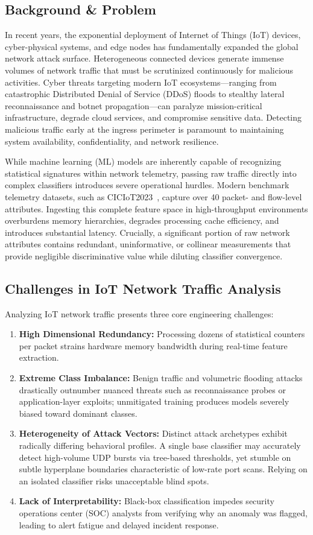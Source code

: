 \documentclass[conference]{IEEEtran}
\begin{document}
\subsection{Background \& Problem}
In recent years, the exponential deployment of Internet of Things (IoT) devices, cyber-physical systems, and edge nodes has fundamentally expanded the global network attack surface. Heterogeneous connected devices generate immense volumes of network traffic that must be scrutinized continuously for malicious activities. Cyber threats targeting modern IoT ecosystems---ranging from catastrophic Distributed Denial of Service (DDoS) floods to stealthy lateral reconnaissance and botnet propagation---can paralyze mission-critical infrastructure, degrade cloud services, and compromise sensitive data. Detecting malicious traffic early at the ingress perimeter is paramount to maintaining system availability, confidentiality, and network resilience.

While machine learning (ML) models are inherently capable of recognizing statistical signatures within network telemetry, passing raw traffic directly into complex classifiers introduces severe operational hurdles. Modern benchmark telemetry datasets, such as CICIoT2023~\cite{ciciot}, capture over 40 packet- and flow-level attributes. Ingesting this complete feature space in high-throughput environments overburdens memory hierarchies, degrades processing cache efficiency, and introduces substantial latency. Crucially, a significant portion of raw network attributes contains redundant, uninformative, or collinear measurements that provide negligible discriminative value while diluting classifier convergence.

\subsection{Challenges in IoT Network Traffic Analysis}
Analyzing IoT network traffic presents three core engineering challenges:
\begin{enumerate}
    \item \textbf{High Dimensional Redundancy:} Processing dozens of statistical counters per packet strains hardware memory bandwidth during real-time feature extraction.
    \item \textbf{Extreme Class Imbalance:} Benign traffic and volumetric flooding attacks drastically outnumber nuanced threats such as reconnaissance probes or application-layer exploits; unmitigated training produces models severely biased toward dominant classes.
    \item \textbf{Heterogeneity of Attack Vectors:} Distinct attack archetypes exhibit radically differing behavioral profiles. A single base classifier may accurately detect high-volume UDP bursts via tree-based thresholds, yet stumble on subtle hyperplane boundaries characteristic of low-rate port scans. Relying on an isolated classifier risks unacceptable blind spots.
    \item \textbf{Lack of Interpretability:} Black-box classification impedes security operations center (SOC) analysts from verifying why an anomaly was flagged, leading to alert fatigue and delayed incident response.
\end{enumerate}
\end{document}
